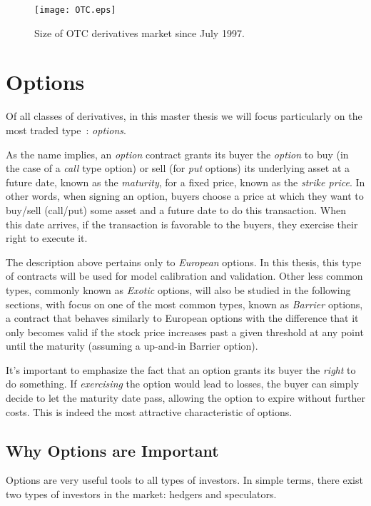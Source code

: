 \begin{figure}[!htb]
    \centering
      \texttt{[image: OTC.eps]}
      \caption{Size of OTC derivatives market since July 1997.}\label{fig:OTC}
    \end{figure}

\section{Options}
\label{section:options}
Of all classes of derivatives, in this master thesis we will focus particularly on the most traded type~\citep{Hull}: \emph{options}.

As the name implies, an \emph{option} contract grants its buyer the \emph{option} to buy (in the case of a \emph{call} type option) or sell (for \emph{put} options) its underlying asset at a future date, known as the \emph{maturity}, for a fixed price, known as the \emph{strike price}.
In other words, when signing an option, buyers choose a price at which they want to buy/sell (call/put) some asset and a future date to do this transaction. When this date arrives, if the transaction is favorable to the buyers, they exercise their right to execute it.

The description above pertains only to \emph{European} options. In this thesis, this type of contracts will be used for model calibration and validation. Other less common types, commonly known as \emph{Exotic} options, will also be studied in the following sections, with focus on one of the most common types, known as \emph{Barrier} options, a contract that behaves similarly to European options with the difference that it only becomes valid if the stock price increases past a given threshold at any point until the maturity (assuming a up-and-in Barrier option).


It's important to emphasize the fact that an option grants its buyer the \emph{right} to do something. If \emph{exercising} the option would lead to losses, the buyer can simply decide to let the maturity date pass, allowing the option to expire without further costs. This is indeed the most attractive characteristic of options.



\subsection{Why Options are Important}
\label{subsection:why options are important}
Options are very useful tools to all types of investors. In simple terms, there exist two types of investors in the market: hedgers and speculators.

